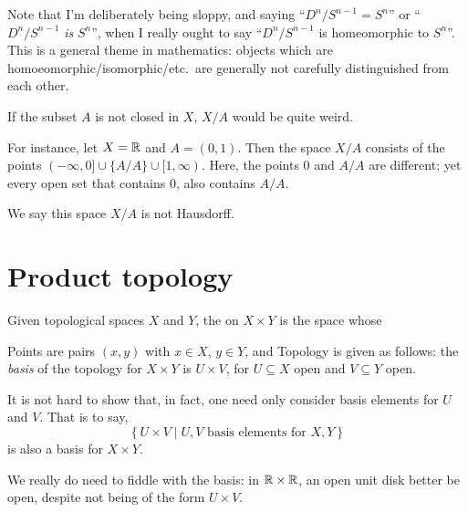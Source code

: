 \begin{abuse}
	Note that I'm deliberately being sloppy, and saying
	``$D^n / S^{n-1} = S^n$'' or ``$D^n / S^{n-1}$ \emph{is} $S^n$'',
	when I really ought to say ``$D^n / S^{n-1}$ is homeomorphic to $S^n$''.
	This is a general theme in mathematics:
	objects which are homoeomorphic/isomorphic/etc.\ are generally
	not carefully distinguished from each other.
\end{abuse}

\begin{example}
	\label{ex:quotient_by_open_set}
	If the subset $A$ is not closed in $X$, $X/A$ would be quite weird.

	For instance, let $X = \mathbb R$ and $A = (0, 1)$. Then the space $X/A$ consists of the points
	$(-\infty, 0] \cup \{A/A\} \cup [1, \infty)$.
	Here, the points $0$ and $A/A$ are different; yet every open set that contains $0$, also
	contains $A/A$.

	We say this space $X/A$ is not Hausdorff.
\end{example}

\section{Product topology}

\begin{definition}
	Given topological spaces $X$ and $Y$,
	the  on $X \times Y$ is the space whose
	\begin{itemize}
		\ii Points are pairs $(x,y)$ with $x \in X$, $y \in Y$, and
		\ii Topology is given as follows: the \emph{basis} of
		the topology for $X \times Y$ is $U \times V$,
		for $U \subseteq X$ open and $V \subseteq Y$ open.
	\end{itemize}
\end{definition}

\begin{remark}
	It is not hard to show that, in fact,
	one need only consider basis elements for $U$ and $V$.
	That is to say,
	\[ \left\{ U \times V \mid
		U,V \text{ basis elements for } X,Y \right\} \]
	is also a basis for $X \times Y$.

	We really do need to fiddle with the basis:
	in $\mathbb R \times \mathbb R$, an open unit disk better be open,
	despite not being of the form $U \times V$.
\end{remark}

